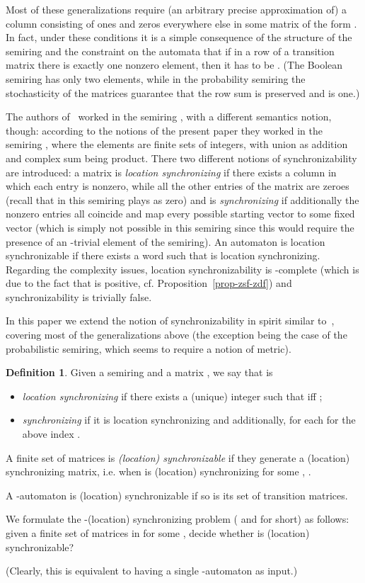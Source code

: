 \documentclass[submission,copyright,creativecommons]{eptcs}
\theoremstyle{plain}
\theoremstyle{definition}
\newtheorem{definition}{Definition}{}
\theoremstyle{remark}
\begin{document}
Most of these generalizations require (an arbitrary precise approximation of) a column consisting of ones and
zeros everywhere else in some matrix of the form . In fact, under these conditions it is a simple consequence of the structure of
the semiring and the constraint on the automata that if in a row of a transition matrix  there is exactly one nonzero element,
then it has to be . (The Boolean semiring has only two elements, while in the probability semiring the stochasticity of the matrices
guarantee that the row sum is preserved and is one.)

The authors of~\cite{larsen} worked in the semiring , with a different semantics notion, though:
according to the notions of the present paper they worked in the semiring , where the elements are finite sets of integers,
with union as addition and complex sum  being product.
There two different notions of synchronizability are introduced: a matrix  is \emph{location synchronizing} if there exists
a column in which each entry is nonzero, while all the other entries of the matrix are zeroes (recall that in this semiring
 plays as zero)
and is \emph{synchronizing} if additionally the nonzero entries all coincide and map every possible starting vector 
to some fixed vector (which is simply not possible in this semiring since this would require the presence of an -trivial element of the semiring).
An automaton  is location synchronizable if there exists a word  such that
 is location synchronizing.
Regarding the complexity issues, location synchronizability is -complete (which is due to the fact
that  is positive, cf. Proposition~\ref{prop-zsf-zdf})
and synchronizability is trivially false.

In this paper we extend the notion of synchronizability in spirit similar to~\cite{larsen}, covering most of the generalizations above
(the exception being the case of the probabilistic semiring, which seems to require a notion of metric).
\begin{definition}
Given a semiring  and a matrix , we say that  is
\begin{itemize}
\item \emph{location synchronizing} if there exists a (unique) integer  such that  iff ;
\item \emph{synchronizing} if it is location synchronizing and additionally,  for each  for the above index .
\end{itemize}
A finite set  of matrices is \emph{(location) synchronizable} if they generate a (location) synchronizing matrix,
i.e. when  is (location) synchronizing for some , .

A -automaton is (location) synchronizable if so is its set of transition matrices.

We formulate the -(location) synchronizing problem
( and  for short)
as follows: given a finite set  of matrices
in  for some , decide whether  is (location) synchronizable?

(Clearly, this is equivalent to having a single -automaton as input.)
\end{definition}
\end{document}
